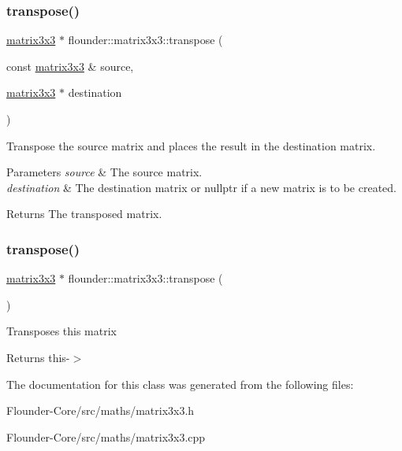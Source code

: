 \subsubsection{\texorpdfstring{transpose()}{transpose()}\hspace{0.1cm}{\footnotesize\ttfamily [1/2]}}
{\footnotesize\ttfamily \hyperlink{classflounder_1_1matrix3x3}{matrix3x3} $\ast$ flounder\+::matrix3x3\+::transpose (\begin{DoxyParamCaption}\item[{const \hyperlink{classflounder_1_1matrix3x3}{matrix3x3} \&}]{source,  }\item[{\hyperlink{classflounder_1_1matrix3x3}{matrix3x3} $\ast$}]{destination }\end{DoxyParamCaption})\hspace{0.3cm}{\ttfamily [static]}}



Transpose the source matrix and places the result in the destination matrix. 


\begin{DoxyParams}{Parameters}
{\em source} & The source matrix. \\
\hline
{\em destination} & The destination matrix or nullptr if a new matrix is to be created. \\
\hline
\end{DoxyParams}
\begin{DoxyReturn}{Returns}
The transposed matrix. 
\end{DoxyReturn}
\mbox{\label{classflounder_1_1matrix3x3_a2cfe1b42645dda116f8251ef183c4028}} 
\subsubsection{\texorpdfstring{transpose()}{transpose()}\hspace{0.1cm}{\footnotesize\ttfamily [2/2]}}
{\footnotesize\ttfamily \hyperlink{classflounder_1_1matrix3x3}{matrix3x3} $\ast$ flounder\+::matrix3x3\+::transpose (\begin{DoxyParamCaption}{ }\end{DoxyParamCaption})}



Transposes this matrix 

\begin{DoxyReturn}{Returns}
this-\/$>$ 
\end{DoxyReturn}


The documentation for this class was generated from the following files\+:\begin{DoxyCompactItemize}
\item 
Flounder-\/\+Core/src/maths/matrix3x3.\+h\item 
Flounder-\/\+Core/src/maths/matrix3x3.\+cpp\end{DoxyCompactItemize}
